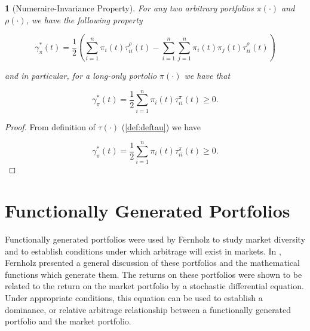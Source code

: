 \documentclass[british]{amsart} \usepackage{lmodern}
\numberwithin{equation}{section} \numberwithin{figure}{section}
\theoremstyle{plain} \newtheorem{thm}{\protect\theoremname}[section]
\theoremstyle{definition} \newtheorem{defn}[thm]{\protect\definitionname}
\theoremstyle{plain} \newtheorem{assumption}[thm]{\protect\assumptionname}
\theoremstyle{plain} \newtheorem{lem}[thm]{\protect\lemmaname}
\theoremstyle{plain} \newtheorem{prop}[thm]{\protect\propositionname}
\theoremstyle{remark} \newtheorem{rem}[thm]{\protect\remarkname}
\theoremstyle{plain} \newtheorem{cor}[thm]{\protect\corollaryname}
\begin{document}
\begin{lem} [Numeraire-Invariance Property]
 For any two arbitrary portfolios $\pi(\cdot)$ and $\rho(\cdot)$, we have the
following property 

  \begin{equation} 
    \label{eq:numeraireinvarianceproperty}
    \gamma_{\pi}^{*}(t) = \frac{1}{2} 
        \left(
          \sum_{i=1}^{n} \pi_{i}(t)\tau_{ii}^{\rho}(t) - 
          \sum_{i=1}^{n} \sum_{j=1}^{n} \pi_{i}(t)\pi_{j}(t)\tau_{ii}^{\rho}(t) 
        \right)
  \end{equation}

  and in particular, for a long-only portolio $\pi(\cdot)$ we have that

  \begin{equation} 
    \label{eq:numeraireinvarianceproperty}
    \gamma_{\pi}^{*}(t) = \frac{1}{2} 
          \sum_{i=1}^{n} \pi_{i}(t)\tau_{ii}^{\pi}(t) 
     \ge 0. 
  \end{equation}
 
\end{lem}

\begin{proof}

  From definition of $\tau(\cdot)$ (\ref{def:deftau}) we have

  \begin{equation} 
    \gamma_{\pi}^{*}(t) = \frac{1}{2} 
          \sum_{i=1}^{n} \pi_{i}(t)\tau_{ii}^{\pi}(t) 
     \ge 0. 
  \end{equation}

\end{proof}

\newpage
\section{Functionally Generated Portfolios}

Functionally generated portfolios were used by Fernholz
\cite{fernholz1999diversity} to study market diversity and to establish
conditions under which arbitrage will exist in markets. In
\cite{fernholz1999pgf}, Fernholz presented a general discussion of these
portfolios and the mathematical functions which generate them. The returns on
these portfolios were shown to be related to the return on the market portfolio
by a stochastic differential equation. Under appropriate conditions, this
equation can be used to establish a dominance, or relative arbitrage
relationship between a functionally generated portfolio and the market
portfolio.
\end{document}
